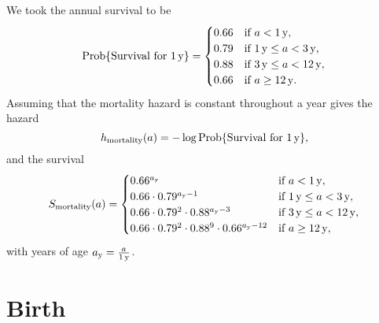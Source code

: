 \documentclass[12pt]{article}
\DeclareMathOperator{\Prob}{Prob}
\begin{document}
We took the annual survival to be
\begin{equation}
  \Prob\{\text{Survival for $\unit[1]{y}$}\}
  =
  \begin{cases}
    0.66 & \text{if $a < \unit[1]{y}$},
    \\
    0.79 & \text{if $\unit[1]{y} \leq a < \unit[3]{y}$},
    \\
    0.88 & \text{if $\unit[3]{y} \leq a < \unit[12]{y}$},
    \\
    0.66 & \text{if $a \geq \unit[12]{y}$}.
  \end{cases}
\end{equation}
Assuming that the mortality hazard is constant throughout a year gives
the hazard
\begin{equation}
  h_{\text{mortality}}(a)
  = - \log \Prob\{\text{Survival for $\unit[1]{y}$}\},
\end{equation}
and the survival
\begin{equation}
  \begin{split}
    S_{\text{mortality}}(a)
    =
    \begin{cases}
      0.66^{a_{\mathrm{y}}}
      & \text{if $a < \unit[1]{y}$},
      \\
      0.66 \cdot 0.79^{a_{\mathrm{y}} - 1}
      & \text{if $\unit[1]{y} \leq a < \unit[3]{y}$},
      \\
      0.66 \cdot 0.79^2 \cdot 0.88^{a_{\mathrm{y}} - 3}
      & \text{if $\unit[3]{y} \leq a < \unit[12]{y}$},
      \\
      0.66 \cdot 0.79^2 \cdot 0.88^9 \cdot 0.66^{a_{\mathrm{y}} - 12}
      & \text{if $a \geq \unit[12]{y}$},
    \end{cases}
  \end{split}
\end{equation}
with years of age $a_{\mathrm{y}} = \frac{a}{\unit[1]{y}}$.

\section{Birth}
\end{document}
